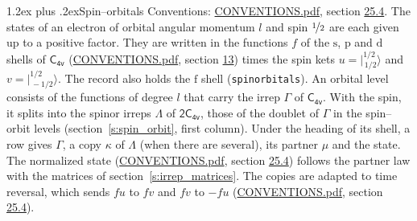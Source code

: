 \documentclass[10pt,a4paper]{article}
\makeatletter
\renewcommand\section{\@startsection{section}{1}{\z@}{-3ex plus -1ex minus -.2ex}%
  {1.2ex plus .2ex}{\normalfont\large\sffamily\bfseries\color{parttitle}}}
\numberwithin{equation}{section}
\newcommand{\grp}[1]{\mathsf{#1}}
\newcommand{\orbital}[1]{\mathrm{#1}}
\newcommand{\mult}{\kappa}
\newcommand{\intx}{\mu}
\newcommand{\jm}[2]{\bigl\lvert{}^{#1}_{\,#2}\bigr\rangle}
\makeatother
\begin{document}
\section{Spin--orbitals}\label{s:spin_orbitals}
Conventions: \href{../../CONVENTIONS.pdf}{CONVENTIONS.pdf}, section \href{../../CONVENTIONS.pdf\#conv.25.4}{25.4}.
\leavevmode\label{n:index.orbital.l}The states of an electron of orbital angular momentum $l$ and spin $\nicefrac{1}{2}$ are each given up to a positive factor. \label{n:local.spinor.uv}\label{n:local.function.f}They are written in the functions $f$ of the $\orbital{s}$, $\orbital{p}$ and $\orbital{d}$ shells of \href{../../../rotation/data/pdf/C4v.pdf}{$\grp{C_{4v}}$} (\href{../../CONVENTIONS.pdf}{CONVENTIONS.pdf}, section \href{../../../rotation/CONVENTIONS.pdf\#conv.13}{13}) times the spin kets $u = \jm{1/2}{1/2}$ and $v = \jm{1/2}{-1/2}$. The record also holds the $\orbital{f}$ shell (\texttt{spinorbitals}). An orbital level consists of the functions of degree $l$ that carry the irrep $\Gamma$ of \href{../../../rotation/data/pdf/C4v.pdf}{$\grp{C_{4v}}$}. With the spin, it splits into the spinor irreps $\Lambda$ of $\grp{2C_{4v}}$, those of the doublet of $\Gamma$ in the spin--orbit levels (section~\ref{s:spin_orbit}, first column). \label{n:head.state}Under the heading of its shell, a row gives $\Gamma$, a copy $\mult$ of $\Lambda$ (when there are several), its partner $\intx$ and the state. The normalized state (\href{../../CONVENTIONS.pdf}{CONVENTIONS.pdf}, section \href{../../CONVENTIONS.pdf\#conv.25.4}{25.4}) follows the partner law with the matrices of section~\ref{s:irrep_matrices}. The copies are adapted to time reversal, which sends $f u$ to $f v$ and $f v$ to $-f u$ (\href{../../CONVENTIONS.pdf}{CONVENTIONS.pdf}, section \href{../../CONVENTIONS.pdf\#conv.25.4}{25.4}).
\end{document}
